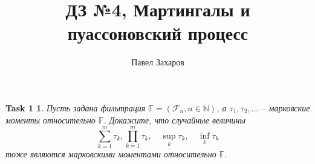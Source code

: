 \documentclass[12pt,a4paper]{extarticle}
\title{\Huge{ДЗ №4, Мартингалы и пуассоновский процесс}}
\author{Павел Захаров}
\date{}
\newtheorem*{task1}{Task 1}
\newcommand{\filtr}{\mathcal{F}}
\newcommand{\Filtr}{\mathbb{F}}
\begin{document}
	\maketitle

	
	\vspace{\baselineskip}

	
	
	\vspace{\baselineskip}
	\begin{task1}
		Пусть задана фильтрация $\Filtr = \left(\filtr_{n}, n \in \mathbb{N}\right)$, а $\tau_{1}, \tau_{2}, \ldots$ -- марковские моменты
		относительно $\Filtr$. Докажите, что случайные величины
		\[
			\sum_{k=1}^{m} \tau_{k}, \prod_{k=1}^{m} \tau_{k}, \quad \sup _{k} \tau_{k}, \quad \inf _{k} \tau_{k}
		\]
		тоже являются марковскими моментами относительно $\Filtr$.
	\end{task1}
\end{document}
